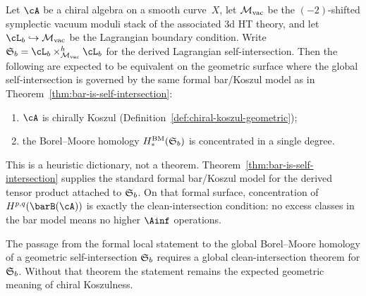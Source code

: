 \begin{conjecture}
\label{conj:koszul-lagrangian-concentration}
Let $\cA$ be a chiral algebra on a smooth curve~$X$, let
$\mathcal{M}_{\mathrm{vac}}$ be the $(-2)$-shifted symplectic vacuum moduli stack of
the associated 3d HT theory, and let
$\cL_b \hookrightarrow \Mvac$ be the Lagrangian boundary condition.
Write $\Steinb_b = \cL_b \times_{\Mvac}^h \cL_b$ for the derived
Lagrangian self-intersection. Then the following are expected to be
equivalent on the geometric surface where the global
self-intersection is governed by the same formal bar/Koszul model as
in Theorem~\ref{thm:bar-is-self-intersection}:
\begin{enumerate}[label=\textup{(\roman*)}]
\item $\cA$ is chirally Koszul
 \textup{(}Definition~\textup{\ref{def:chiral-koszul-geometric})};
\item the Borel--Moore homology $H_*^{\mathrm{BM}}(\mathfrak{S}_b)$ is
 concentrated in a single degree.
\end{enumerate}
\end{conjecture}

\begin{remark}[Evidence]
This is a heuristic dictionary, not a theorem.
Theorem~\ref{thm:bar-is-self-intersection}
supplies the standard formal bar/Koszul model for the derived tensor
product attached to $\mathfrak{S}_b$. On that formal surface,
concentration of $H^{p,q}(\barB(\cA))$ is exactly the clean-intersection
condition: no excess classes in the bar model means no higher
$\Ainf$ operations.

The passage from the formal local statement to the global
Borel--Moore homology of a geometric self-intersection $\mathfrak{S}_b$
requires a global clean-intersection theorem for $\mathfrak{S}_b$. Without
that theorem the statement remains the expected geometric meaning of
chiral Koszulness.
\end{remark}

